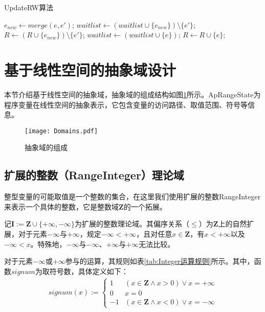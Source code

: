 \begin{algorithm}[H]
	\caption{UpdateRW算法}
	\label{alg:UpdateRW}
	\begin{algorithmic}[1]
		
				\State $ e_{new}  \gets merge(e, e')$;
					\State $ waitlist \gets (waitlist \cup \{e_{new}\}) \setminus \{e'\} $;
					\State $ R \gets (R \cup \{e_{new}\}) \setminus \{e'\} $;
				\EndIf
			\EndFor
				\State $ waitlist \gets (waitlist \cup \{e\}) $;
				\State $ R \gets R \cup \{e\} $;
			\EndIf
		\EndFunction
		
	\end{algorithmic}
\end{algorithm}

\section{基于线性空间的抽象域设计}

本节介绍基于线性空间的抽象域，抽象域的组成结构如图\ref{fig:Domains}所示。ApRangeState为程序变量在线性空间的抽象表示，它包含变量的访问路径、取值范围、符号等信息。

\begin{figure}[H]
	\centering
	\texttt{[image: Domains.pdf]}
	\caption{抽象域的组成}
	\label{fig:Domains}
\end{figure}

\subsection{扩展的整数（RangeInteger）理论域}

整型变量的可能取值是一个整数的集合，在这里我们使用扩展的整数RangeInteger来表示一个具体的整数，它是整数域$ \mathbf{Z} $的一个拓展。

记$ \mathbf{I} := \mathbf{Z} \cup \{ +\infty, -\infty \}  $为扩展的整数理论域。其偏序关系（$ \le $）为$ \mathbf{Z} $上的自然扩展，对于元素$ -\infty $与$ +\infty $，规定$ -\infty < +\infty $，且对任意$ x \in \mathbf{Z} $，有$ x < +\infty $以及$ -\infty < x $。特殊地，$ -\infty $与$ -\infty $、$ +\infty $与$ +\infty $无法比较。

对于元素$ -\infty $或$ +\infty $参与的运算，其规则如表\ref{tab:Integer运算规则}所示。其中，函数$ signum $为取符号数，具体定义如下：
\begin{align}
	signum(x) := \begin{cases}
		1 & (x \in \mathbf{Z} \land x > 0) \lor x = +\infty\\
		0 & x = 0\\
		-1 & (x \in \mathbf{Z} \land x < 0) \lor x = -\infty
	\end{cases}
\end{align}

